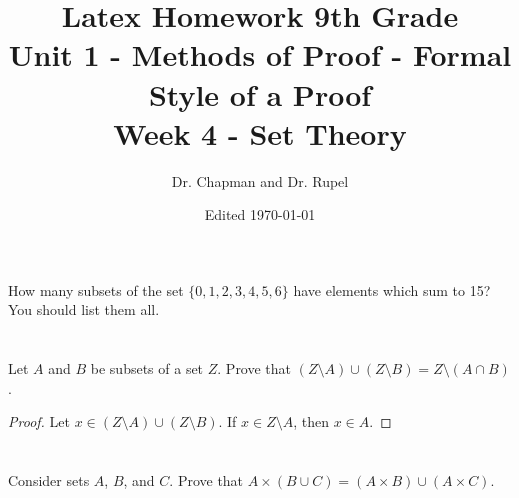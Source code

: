 \documentclass{article}
\title{Latex Homework 9th Grade\\ Unit 1 - Methods of Proof - Formal Style of a Proof\\ Week 4 - Set Theory}
\author{Dr. Chapman and Dr. Rupel}
\date{Edited \today}
\newcommand{\sm}{\setminus}
\begin{document}
\maketitle

\section{}
    How many subsets of the set \(\{0,1,2,3,4,5,6\}\) have elements which sum to 15?
    You should list them all.

\section{}
    Let $A$ and $B$ be subsets of a set $Z$.
    Prove that $(Z\sm A)\cup(Z\sm B)=Z\sm(A\cap B)$.
    \begin{proof}
     Let $x \in (Z\sm A)\cup(Z\sm B)$. If $x\in Z\sm A$, then $x\in A$.
    \end{proof}
\section{}
    Consider sets $A$, $B$, and $C$.
    Prove that $A\times(B\cup C)=(A\times B)\cup(A\times C)$.
\end{document}
